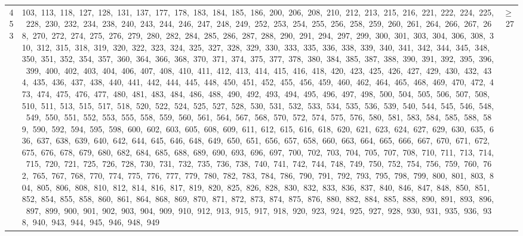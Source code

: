 \begin{longtable}{c|p{}|r}
453 & 103,\ 113,\ 118,\ 127,\ 128,\ 131,\ 137,\ 177,\ 178,\ 183,\ 184,\ 185,\ 186,\ 200,\ 206,\ 208,\ 210,\ 212,\ 213,\ 215,\ 216,\ 221,\ 222,\ 224,\ 225,\ 228,\ 230,\ 232,\ 234,\ 238,\ 240,\ 243,\ 244,\ 246,\ 247,\ 248,\ 249,\ 252,\ 253,\ 254,\ 255,\ 256,\ 258,\ 259,\ 260,\ 261,\ 264,\ 266,\ 267,\ 268,\ 270,\ 272,\ 274,\ 275,\ 276,\ 279,\ 280,\ 282,\ 284,\ 285,\ 286,\ 287,\ 288,\ 290,\ 291,\ 294,\ 297,\ 299,\ 300,\ 301,\ 303,\ 304,\ 306,\ 308,\ 310,\ 312,\ 315,\ 318,\ 319,\ 320,\ 322,\ 323,\ 324,\ 325,\ 327,\ 328,\ 329,\ 330,\ 333,\ 335,\ 336,\ 338,\ 339,\ 340,\ 341,\ 342,\ 344,\ 345,\ 348,\ 350,\ 351,\ 352,\ 354,\ 357,\ 360,\ 364,\ 366,\ 368,\ 370,\ 371,\ 374,\ 375,\ 377,\ 378,\ 380,\ 384,\ 385,\ 387,\ 388,\ 390,\ 391,\ 392,\ 395,\ 396,\ 399,\ 400,\ 402,\ 403,\ 404,\ 406,\ 407,\ 408,\ 410,\ 411,\ 412,\ 413,\ 414,\ 415,\ 416,\ 418,\ 420,\ 423,\ 425,\ 426,\ 427,\ 429,\ 430,\ 432,\ 434,\ 435,\ 436,\ 437,\ 438,\ 440,\ 441,\ 442,\ 444,\ 445,\ 448,\ 450,\ 451,\ 452,\ 455,\ 456,\ 459,\ 460,\ 462,\ 464,\ 465,\ 468,\ 469,\ 470,\ 472,\ 473,\ 474,\ 475,\ 476,\ 477,\ 480,\ 481,\ 483,\ 484,\ 486,\ 488,\ 490,\ 492,\ 493,\ 494,\ 495,\ 496,\ 497,\ 498,\ 500,\ 504,\ 505,\ 506,\ 507,\ 508,\ 510,\ 511,\ 513,\ 515,\ 517,\ 518,\ 520,\ 522,\ 524,\ 525,\ 527,\ 528,\ 530,\ 531,\ 532,\ 533,\ 534,\ 535,\ 536,\ 539,\ 540,\ 544,\ 545,\ 546,\ 548,\ 549,\ 550,\ 551,\ 552,\ 553,\ 555,\ 558,\ 559,\ 560,\ 561,\ 564,\ 567,\ 568,\ 570,\ 572,\ 574,\ 575,\ 576,\ 580,\ 581,\ 583,\ 584,\ 585,\ 588,\ 589,\ 590,\ 592,\ 594,\ 595,\ 598,\ 600,\ 602,\ 603,\ 605,\ 608,\ 609,\ 611,\ 612,\ 615,\ 616,\ 618,\ 620,\ 621,\ 623,\ 624,\ 627,\ 629,\ 630,\ 635,\ 636,\ 637,\ 638,\ 639,\ 640,\ 642,\ 644,\ 645,\ 646,\ 648,\ 649,\ 650,\ 651,\ 656,\ 657,\ 658,\ 660,\ 663,\ 664,\ 665,\ 666,\ 667,\ 670,\ 671,\ 672,\ 675,\ 676,\ 678,\ 679,\ 680,\ 682,\ 684,\ 685,\ 688,\ 689,\ 690,\ 693,\ 696,\ 697,\ 700,\ 702,\ 703,\ 704,\ 705,\ 707,\ 708,\ 710,\ 711,\ 713,\ 714,\ 715,\ 720,\ 721,\ 725,\ 726,\ 728,\ 730,\ 731,\ 732,\ 735,\ 736,\ 738,\ 740,\ 741,\ 742,\ 744,\ 748,\ 749,\ 750,\ 752,\ 754,\ 756,\ 759,\ 760,\ 762,\ 765,\ 767,\ 768,\ 770,\ 774,\ 775,\ 776,\ 777,\ 779,\ 780,\ 782,\ 783,\ 784,\ 786,\ 790,\ 791,\ 792,\ 793,\ 795,\ 798,\ 799,\ 800,\ 801,\ 803,\ 804,\ 805,\ 806,\ 808,\ 810,\ 812,\ 814,\ 816,\ 817,\ 819,\ 820,\ 825,\ 826,\ 828,\ 830,\ 832,\ 833,\ 836,\ 837,\ 840,\ 846,\ 847,\ 848,\ 850,\ 851,\ 852,\ 854,\ 855,\ 858,\ 860,\ 861,\ 864,\ 868,\ 869,\ 870,\ 871,\ 872,\ 873,\ 874,\ 875,\ 876,\ 880,\ 882,\ 884,\ 885,\ 888,\ 890,\ 891,\ 893,\ 896,\ 897,\ 899,\ 900,\ 901,\ 902,\ 903,\ 904,\ 909,\ 910,\ 912,\ 913,\ 915,\ 917,\ 918,\ 920,\ 923,\ 924,\ 925,\ 927,\ 928,\ 930,\ 931,\ 935,\ 936,\ 938,\ 940,\ 943,\ 944,\ 945,\ 946,\ 948,\ 949 & $\ge$ 27 \\

\end{longtable}

